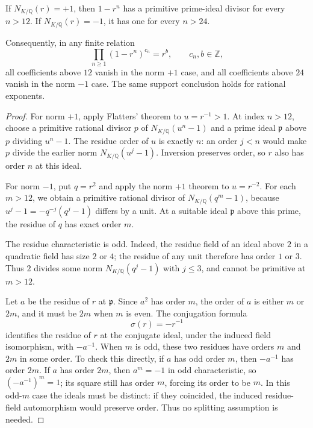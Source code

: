 \begin{theorem}
\label{golden:thm:quadratic-cutoff}
If $N_{K/\mathbb Q}(r)=+1$, then $1-r^n$ has a primitive prime-ideal
divisor for every $n>12$.  If $N_{K/\mathbb Q}(r)=-1$, it has one
for every $n>24$.

Consequently, in any finite relation
\begin{equation}
 \prod_{n\ge1}(1-r^n)^{c_n}=r^b,
 \qquad c_n,b\in\mathbb Z,
 \label{golden:eq:general-seed}
\end{equation}
all coefficients above $12$ vanish in the norm $+1$ case, and all
coefficients above $24$ vanish in the norm $-1$ case.
The same support conclusion holds for rational exponents.
\end{theorem}

\begin{proof}
For norm $+1$, apply Flatters' theorem to $u=r^{-1}>1$.
At index $n>12$, choose a primitive rational divisor $p$ of
$N_{K/\mathbb Q}(u^n-1)$ and a prime ideal $\mathfrak p$ above $p$
dividing $u^n-1$.  The residue order of $u$ is exactly $n$: an order
$j<n$ would make $p$ divide the earlier norm
$N_{K/\mathbb Q}(u^j-1)$.  Inversion preserves order, so $r$ also
has order $n$ at this ideal.

For norm $-1$, put $q=r^2$ and apply the norm $+1$ theorem to
$u=r^{-2}$.  For each $m>12$, we obtain a primitive rational divisor
of $N_{K/\mathbb Q}(q^m-1)$, because
$u^j-1=-q^{-j}(q^j-1)$ differs by a unit.  At a suitable ideal
$\mathfrak p$ above this prime, the residue of $q$ has exact order
$m$.

The residue characteristic is odd.  Indeed, the residue field of an
ideal above $2$ in a quadratic field has size $2$ or $4$; the residue
of any unit therefore has order $1$ or $3$.  Thus $2$ divides some
norm $N_{K/\mathbb Q}(q^j-1)$ with $j\le3$, and cannot be
primitive at $m>12$.

Let $a$ be the residue of $r$ at $\mathfrak p$.  Since $a^2$ has
order $m$, the order of $a$ is either $m$ or $2m$, and it must be
$2m$ when $m$ is even.  The conjugation formula
\begin{equation}
 \sigma(r)=-r^{-1}
 \label{golden:eq:normminus-conjugation}
\end{equation}
identifies the residue of $r$ at the conjugate ideal, under the
induced field isomorphism, with $-a^{-1}$.  When $m$ is odd, these
two residues have orders $m$ and $2m$ in some order.  To check this
directly, if $a$ has odd order $m$, then $-a^{-1}$ has order $2m$.
If $a$ has order $2m$, then $a^m=-1$ in odd characteristic, so
$(-a^{-1})^m=1$; its square still has order $m$, forcing its order
to be $m$.
In this odd-$m$ case the ideals must be distinct: if they coincided,
the induced residue-field automorphism would preserve order.  Thus
no splitting assumption is needed.


\end{proof}
